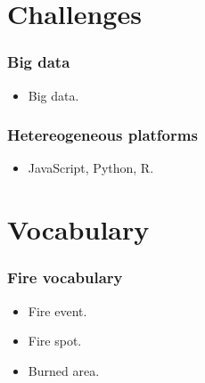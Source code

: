 \documentclass{beamer}
\begin{document}
\section{Challenges}

\begin{frame}[t, allowframebreaks]
    \frametitle{Big data}
    \begin{itemize}
        \item Big data.
    \end{itemize}
\end{frame}



\begin{frame}[t, allowframebreaks]
    \frametitle{Hetereogeneous platforms}
    \begin{itemize}
        \item JavaScript, Python, R.
    \end{itemize}
\end{frame}



\section{Vocabulary}

\begin{frame}[t, allowframebreaks]
    \frametitle{Fire vocabulary}
    \begin{itemize}
        \item Fire event.
        \item Fire spot.
        \item Burned area.
    \end{itemize}
\end{frame}







\end{document}

